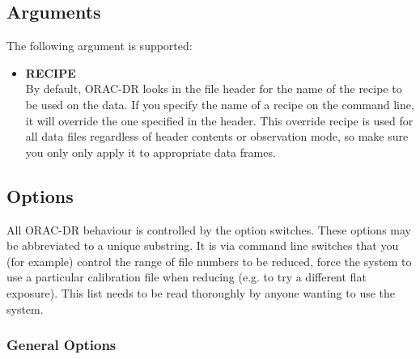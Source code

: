 \documentclass[twoside,11pt]{article}
\renewcommand{\_}{\texttt{\symbol{95}}}
\begin{document}
\subsection*{Arguments}%

The following argument  is  supported:

\begin{itemize}

\item{\bf RECIPE}%
%
\hfil\\
By default, ORAC-DR looks in the file header for the name of the
recipe to be used on the data. If you specify the name of a recipe on
the command line, it will override the one specified in the
header. This override recipe is used for all data files regardless of
header contents or observation mode, so make sure you only only apply
it to appropriate data frames.

\end{itemize}

\subsection*{Options}%

All ORAC-DR behaviour is controlled by the option
switches. These options may be abbreviated to a unique substring. It
is via command line switches that you (for example) control the range
of file numbers to be reduced, force the system to use a particular
calibration file when reducing (e.g. to try a different flat
exposure). This list needs to be read thoroughly by anyone wanting to
use the system.

\subsubsection*{General Options}%
\end{document}
